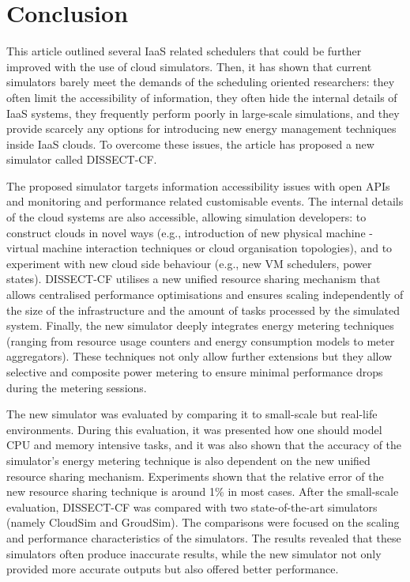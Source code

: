 \documentclass[sort, compress, 5p]{elsarticle}
\begin{document}
\section{Conclusion} \label{sec-conclusion}
This article outlined several IaaS related schedulers that could be further improved with the use of cloud simulators. Then, it has shown that current simulators barely meet the demands of the scheduling oriented researchers:  they often limit the accessibility of information,  they often hide the internal details of IaaS systems,  they frequently perform poorly in large-scale simulations, and  they provide scarcely any options for introducing new energy management techniques inside IaaS clouds. To overcome these issues, the article has proposed a new simulator called DISSECT-CF.

The proposed simulator targets information accessibility issues with open APIs and monitoring and performance related customisable events. The internal details of the cloud systems are also accessible, allowing simulation developers:  to construct clouds in novel ways (e.g., introduction of new physical machine - virtual machine interaction techniques or cloud organisation topologies), and  to experiment with new cloud side behaviour (e.g., new VM schedulers, power states). DISSECT-CF utilises a new unified resource sharing mechanism that allows centralised performance optimisations and ensures scaling independently of the size of the infrastructure and the amount of tasks processed by the simulated system. Finally, the new simulator deeply integrates energy metering techniques (ranging from resource usage counters and energy consumption models to meter aggregators). These techniques not only allow further extensions but they allow selective and composite power metering to ensure minimal performance drops during the metering sessions.

The new simulator was evaluated by comparing it to small-scale but real-life environments. During this evaluation, it was presented how one should model CPU and memory intensive tasks, and it was also shown that the accuracy of the simulator's energy metering technique is also dependent on the new unified resource sharing mechanism. Experiments shown that the relative error of the new resource sharing technique is around 1\% in most cases. After the small-scale evaluation, DISSECT-CF was  compared with two state-of-the-art simulators (namely CloudSim and GroudSim). The comparisons were  focused on the scaling and performance characteristics of the simulators. The results revealed that these simulators often produce inaccurate results, while the new simulator not only provided more accurate outputs but also offered better performance.
\end{document}
